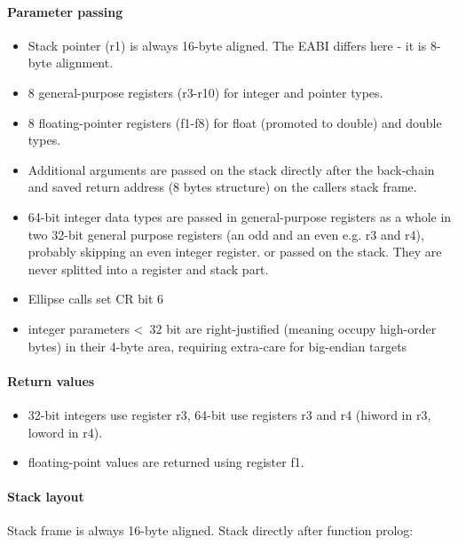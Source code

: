 \paragraph{Parameter passing}

\begin{itemize}
\item Stack pointer (r1) is always 16-byte aligned. The EABI differs here - it is 8-byte alignment.
\item 8 general-purpose registers (r3-r10) for integer and pointer types.
\item 8 floating-pointer registers (f1-f8) for float (promoted to double) and double types.
\item Additional arguments are passed on the stack directly after the back-chain and saved return address (8 bytes structure) on the callers stack frame.
\item 64-bit integer data types are passed in general-purpose registers as a whole in two
 32-bit general purpose registers (an odd and an even e.g. r3 and r4), probably skipping an even integer register.
 or passed on the stack. They are never splitted into a register and stack part.
\item Ellipse calls set CR bit 6 
\item integer parameters \textless\ 32 bit are right-justified (meaning occupy high-order bytes) in their 4-byte area, requiring extra-care for big-endian targets
\end{itemize}

\paragraph{Return values}

\begin{itemize}
\item 32-bit integers use register r3, 64-bit use registers r3 and r4 (hiword in r3, loword in r4).
\item floating-point values are returned using register f1.
\end{itemize}

\pagebreak

\paragraph{Stack layout}

Stack frame is always 16-byte aligned. Stack directly after function prolog:\\

